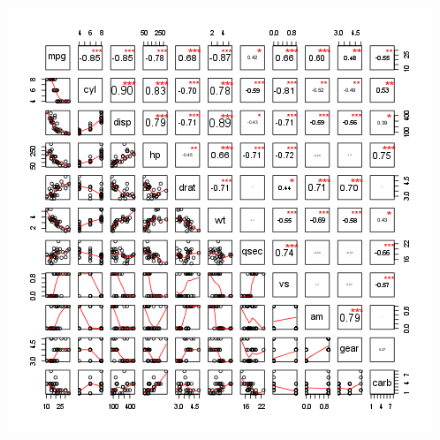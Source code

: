 \documentclass{article}
\makeatletter
\def\maxwidth{\ifdim\Gin@nat@width>\linewidth\linewidth
\else\Gin@nat@width\fi}
\let\Oldincludegraphics\includegraphics
\renewcommand{\includegraphics}[1]{\Oldincludegraphics[width=\maxwidth]{#1}}
\makeatother
\begin{document}
\begin{figure}[htbp]
\centering
\includegraphics{ce42e944b62284a3bebf2101155af100.png}
\caption{}
\end{figure}
\end{document}
